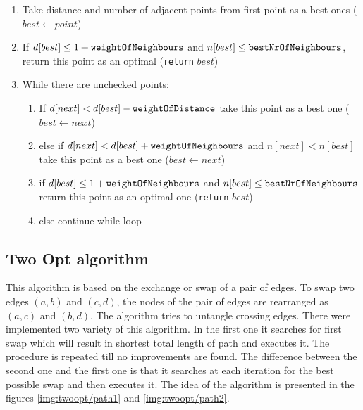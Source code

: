 \documentclass[titlepage]{article}
\begin{document}
\begin{enumerate}
	\item Take distance and number of adjacent points from first point as a best ones ($best \leftarrow point$)
	\item If $d[best] \leq 1 + \mbox{\texttt{weightOfNeighbours}}$ and $n[best] \leq \mbox{\texttt{bestNrOfNeighbours}}$, return this point as an optimal (\texttt{return} $best$)
	\item While there are unchecked points:
	
	\begin{enumerate}[label*=\arabic*.]
		\item If $d[next] < d[best] - \mbox{\texttt{weightOfDistance}}$ take this point as a best one ($best \leftarrow next$)
		\item else if $d[next] < d[best] + \mbox{\texttt{weightOfNeighbours}}$ and $n[next] < n[best]$ take this point as a best one ($best \leftarrow next$)
		\item if $d[best] \leq 1 + \mbox{\texttt{weightOfNeighbours}}$ and $n[best] \leq \mbox{\texttt{bestNrOfNeighbours}}$ return this point as an optimal one (\texttt{return} $best$)
		\item else continue while loop
	\end{enumerate}
\end{enumerate}


\subsection{Two Opt algorithm}

This algorithm is based on the exchange or swap of a pair of edges. To swap two edges $(a, b)$ and $(c, d)$, the nodes of the pair of edges are rearranged as $(a, c)$ and $(b, d)$. The algorithm tries to untangle crossing edges. There were implemented two variety of this algorithm. In the first one it searches for first swap which will result in shortest total length of path and executes it. The procedure is repeated till no improvements are found. The difference between the second one and the first one is that it searches at each iteration for the best possible swap and then executes it. The idea of the algorithm is presented in the figures \ref{img:twoopt/path1} and \ref{img:twoopt/path2}.
\end{document}
